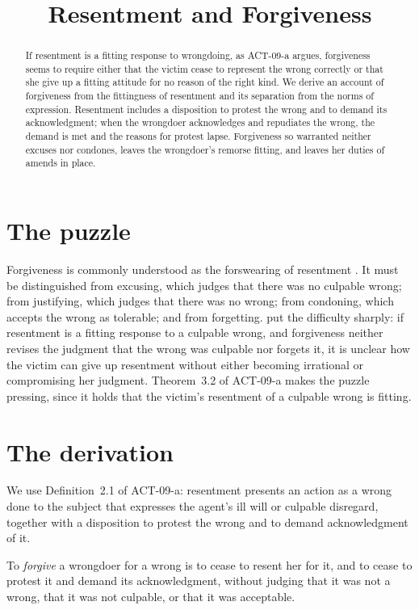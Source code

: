 \documentclass{situationist-preprint}
\title{Resentment and Forgiveness}
\begin{document}
\maketitle

\begin{abstract}
If resentment is a fitting response to wrongdoing, as ACT-09-a argues, forgiveness seems to require either that the victim cease to represent the wrong correctly or that she give up a fitting attitude for no reason of the right kind. We derive an account of forgiveness from the fittingness of resentment and its separation from the norms of expression. Resentment includes a disposition to protest the wrong and to demand its acknowledgment; when the wrongdoer acknowledges and repudiates the wrong, the demand is met and the reasons for protest lapse. Forgiveness so warranted neither excuses nor condones, leaves the wrongdoer's remorse fitting, and leaves her duties of amends in place.
\end{abstract}

\section{The puzzle}

Forgiveness is commonly understood as the forswearing of resentment \citep{Butler1726,MurphyHampton1988}. It must be distinguished from excusing, which judges that there was no culpable wrong; from justifying, which judges that there was no wrong; from condoning, which accepts the wrong as tolerable; and from forgetting. \citet{Hieronymi2001} put the difficulty sharply: if resentment is a fitting response to a culpable wrong, and forgiveness neither revises the judgment that the wrong was culpable nor forgets it, it is unclear how the victim can give up resentment without either becoming irrational or compromising her judgment. Theorem~3.2 of ACT-09-a makes the puzzle pressing, since it holds that the victim's resentment of a culpable wrong is fitting.

\section{The derivation}

We use Definition~2.1 of ACT-09-a: resentment presents an action as a wrong done to the subject that expresses the agent's ill will or culpable disregard, together with a disposition to protest the wrong and to demand acknowledgment of it.

\begin{definition}[Forgiveness]\label{d:forgive}
To \emph{forgive} a wrongdoer for a wrong is to cease to resent her for it, and to cease to protest it and demand its acknowledgment, without judging that it was not a wrong, that it was not culpable, or that it was acceptable.
\end{definition}
\end{document}
